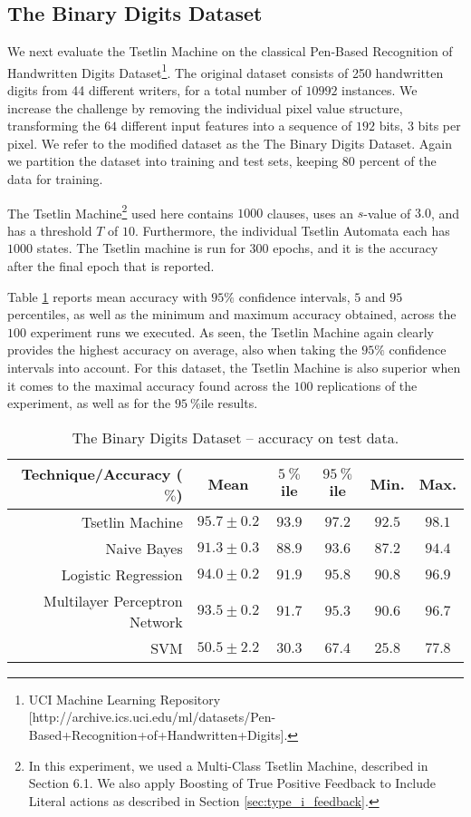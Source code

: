 \documentclass[11pt,a4paper]{article}
\begin{document}
\subsection{The Binary Digits Dataset}

We next evaluate the Tsetlin Machine on the classical Pen-Based Recognition of Handwritten Digits Dataset\footnote{UCI Machine Learning Repository [http://archive.ics.uci.edu/ml/datasets/Pen-Based+Recognition+of+Handwritten+Digits].}. The original dataset consists of 250 handwritten digits from 44 different writers, for a total number of $10 992$ instances. We increase the challenge by removing the individual pixel value structure, transforming the $64$ different input features into a sequence of $192$ bits, $3$ bits per pixel. We refer to the modified dataset as the The Binary Digits Dataset. Again we partition the dataset into training and test sets, keeping 80 percent of the data for training.

The Tsetlin Machine\footnote{In this experiment, we used a Multi-Class Tsetlin Machine, described in Section 6.1.  We also apply Boosting of True  Positive  Feedback  to  Include  Literal  actions as described in Section \ref{sec:type_i_feedback}.} used here contains $1000$ clauses, uses an $s$-value of $3.0$, and has a threshold $T$ of $10$. Furthermore, the individual Tsetlin Automata each has $1000$ states. The Tsetlin machine is run for $300$ epochs, and it is the accuracy after the final epoch that is reported.

Table \ref{tab:accuracy_binary_digits_test} reports mean accuracy with $95\%$ confidence intervals, $5$ and $95$ percentiles, as well as the minimum and maximum accuracy obtained, across the $100$ experiment runs we executed. As seen, the Tsetlin Machine again clearly provides the highest accuracy on average, also when taking the $95\%$ confidence intervals into account. For this dataset, the Tsetlin Machine is also superior when it comes to the maximal accuracy found across the $100$ replications of the experiment, as well as for the $95~\%$ile results.

\begin{table}[!bh]
    \centering
    \begin{tabular}{r||c|c|c|c|c}
         \bf Technique/Accuracy ($\%$)&\bf Mean&\bf $5~\%$ile &\bf $95~\%$ile&\bf Min.&\bf Max.\\
         \hline
    Tsetlin Machine&$95.7 \pm 0.2$&$93.9$&$97.2$&$92.5$&$98.1$\\
    Naive Bayes&$91.3 \pm 0.3$&$88.9$&$93.6$&$87.2$&$94.4$\\
    Logistic Regression&$94.0 \pm 0.2$&$91.9$&$95.8$&$90.8$&$96.9$\\
    Multilayer Perceptron Network&$93.5 \pm 0.2$&$91.7$&$95.3$&$90.6$&$96.7$\\
    SVM&$50.5 \pm 2.2$&$30.3$&$67.4$&$25.8$&$77.8$
    \end{tabular}
    \caption{The Binary Digits Dataset -- accuracy on test data.}
    \label{tab:accuracy_binary_digits_test}
\end{table}
\end{document}

